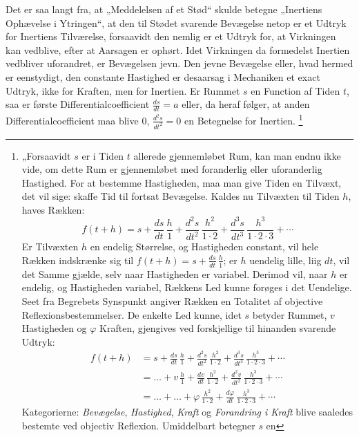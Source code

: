 \documentclass[12pt]{book}
\newcommand{\opage}[1]{\marginnote{\footnotesize\textit{[#1]}}}
\begin{document}
Det er saa langt fra, at „Meddelelsen af et Stød“
\opage{339} skulde betegne „Inertiens Ophævelse i Ytringen“, at den til Stødet svarende Bevægelse
netop er et Udtryk for Inertiens Tilværelse, forsaavidt den nemlig er et Udtryk for, at
Virkningen kan vedblive, efter at Aarsagen er ophørt. Idet Virkningen da formedelst
Inertien vedbliver uforandret, er Bevægelsen jevn. Den jevne Bevægelse eller, hvad hermed
er eenstydigt, den constante Hastighed er desaarsag i Mechaniken et exact Udtryk, ikke for
Kraften, men for Inertien. Er Rummet $s$ en Function af Tiden $t$, saa er første
Differentialcoefficient $\frac{ds}{dt} = a$ eller, da heraf følger, at anden
Differentialcoefficient maa blive $0$, $\frac{d^{2}s}{dt^{2}} = 0$ en Betegnelse for
Inertien.%
\footnote{„Forsaavidt $s$ er i Tiden $t$ allerede gjennemløbet Rum, kan man endnu ikke
  vide, om dette Rum er gjennemløbet med foranderlig eller uforanderlig Hastighed. For at
  bestemme Hastigheden, maa man give Tiden en Tilvæxt, det vil sige: skaffe Tid til
  fortsat Bevægelse. Kaldes nu Tilvæxten til Tiden $h$, haves Rækken:
  \[ f(t+h) = s + \frac{ds}{dt}\,\frac{h}{1} + \frac{d^{2}s}{dt^{2}}\,\frac{h^{2}}{1\cdot 2}
     + \frac{d^{3}s}{dt^{3}}\,\frac{h^{3}}{1\cdot 2\cdot 3} + \cdots \]
  Er Tilvæxten $h$ en endelig Størrelse, og Hastigheden constant, vil hele Rækken
  indskrænke sig til $f(t+h) = s + \frac{ds}{dt}\,\frac{h}{1}$; er $h$ uendelig lille, liig
  $dt$, vil det Samme gjælde, selv naar Hastigheden er variabel. Derimod vil, naar $h$ er
  endelig, og Hastigheden variabel, Rækkens Led kunne forøges i det Uendelige.
  Seet fra Begrebets Synspunkt angiver Rækken en Totalitet af objective
  Reflexionsbestemmelser. De enkelte Led kunne, idet $s$ betyder Rummet, $v$ Hastigheden
  og $\varphi$ Kraften, gjengives ved forskjellige til hinanden svarende Udtryk:
  \[ \begin{aligned}
     f(t+h) &= s + \frac{ds}{dt}\,\frac{h}{1} + \frac{d^{2}s}{dt^{2}}\,\frac{h^{2}}{1\cdot 2}
        + \frac{d^{3}s}{dt^{3}}\,\frac{h^{3}}{1\cdot 2\cdot 3} + \cdots\\
     &= \ldots + v\,\frac{h}{1} + \frac{dv}{dt}\,\frac{h^{2}}{1\cdot 2}
        + \frac{d^{2}v}{dt^{2}}\,\frac{h^{3}}{1\cdot 2\cdot 3} + \cdots\\
     &= \ldots + \ldots + \varphi\,\frac{h^{2}}{1\cdot 2}
        + \frac{d\varphi}{dt}\,\frac{h^{3}}{1\cdot 2\cdot 3} + \cdots
     \end{aligned} \]
  Kategorierne: \emph{Bevægelse}, \emph{Hastighed}, \emph{Kraft} og \emph{Forandring i
  Kraft} blive saaledes bestemte ved objectiv Reflexion. Umiddelbart betegner $s$ en
}
\end{document}
